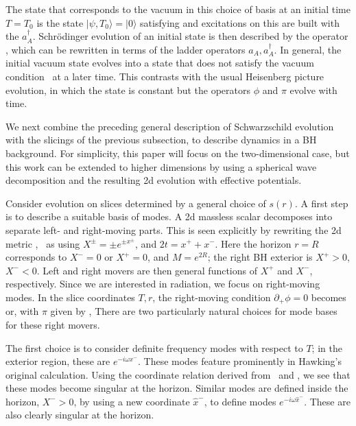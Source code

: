The state that corresponds to the vacuum in this choice of basis at an initial time $T=T_0$ is the state $|\psi,T_0\rangle=|0\rangle$
satisfying
%
\eqn{}
%
and excitations on this are built with the $a_A^\dagger$.
Schr\"odinger evolution of an initial state is then described by the  operator \evolop, which can be rewritten in terms of the ladder operators $a_A, a_A^\dagger$.  In general, the initial vacuum state evolves into a state that does not satisfy the vacuum condition \vacdef\ at a later time.  This contrasts with the usual Heisenberg picture evolution, in which the state is constant but the operators $\phi$ and $\pi$ evolve with time.


We next combine the preceding general description of Schwarzschild evolution with the slicings of the previous subsection, to describe dynamics in a BH background.
For simplicity, this paper will focus on the two-dimensional case, but this work can be extended to higher dimensions by using a spherical wave decomposition and the resulting 2d evolution with effective potentials.


Consider evolution on slices determined by a 
general choice of  $s(r)$.  A first step is to describe a suitable basis of modes.  A 2d massless scalar decomposes into separate left- and right-moving parts.  This is seen explicitly by rewriting the 2d metric \Schw, \TDbh\ as
%
\eqn{}
%
using
%
\eqn{}
%
$X^\pm=\pm e^{\pm x^\pm}$, and $2t=x^++x^-$.  Here the horizon $r=R$ corresponds to $X^-=0$ or $X^+=0$, and $M=e^{2R}$; the right BH exterior is $X^+>0$, $X^-<0$.  
Left and right movers are then general functions of $X^+$ and $X^-$, respectively.  Since we are interested in radiation, we focus on right-moving modes.
In the slice coordinates $T,r$, the right-moving condition $\partial_+ \phi=0$ becomes
%
\eqn{}
%
or, with $\pi$ given by \canonp, 
%
\eqn{}
%
There are two particularly natural choices for mode bases for these right movers.  


The first choice is to consider definite frequency modes with respect to $T$; in the exterior region, these are  $e^{-i\omega x^-}$.
These modes feature prominently in Hawking's original calculation.  Using the coordinate relation
%
\eqn{}
%
derived from \slicedef\ and \rtoX,
we see that these modes become singular at the horizon.  Similar modes are defined inside the horizon, $X^->0$, by using a new coordinate
$\hat x^-$, 
%
\eqn{}
%
to define modes $e^{-i\omega \hat x^-}$.  These are also clearly singular at the horizon. 


